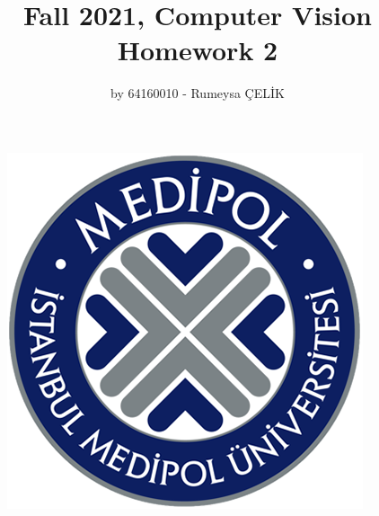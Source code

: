 \documentclass[a4paper, 12pt]{report}
\begin{document}
\begin{figure}
\includegraphics[scale=.63]{medipol.png}
\centering
\end{figure}
\begin{titlepage}
\title{Fall 2021, Computer Vision \\ Homework 2}
\author{by 64160010 - Rumeysa ÇELİK}
\maketitle
\end{titlepage}
\end{document}
